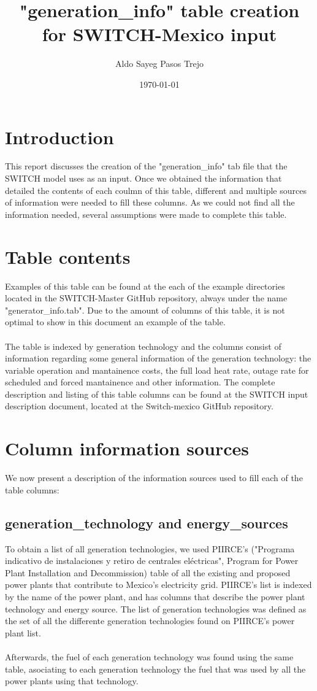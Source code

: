 \documentclass[12pt,letterpaper]{article}
\title{"generation\_info" table creation for SWITCH-Mexico input}
\author[1,2]{Aldo Sayeg Pasos Trejo}
\affil[1]{\textit{Physics Departament. Facultad de Ciencias. Universidad Nacional Autónoma de México}}
\affil[2]{\textit{Visiting Student Researcher for the Berkeley Energy and Climate Institute at University of California, Berkeley}}
\date{\today}
\begin{document}
\maketitle
\section{Introduction}
This report discusses the creation of the "generation\_info" tab file that the SWITCH model uses as an input. Once we obtained the information that detailed the contents of each coulmn of this table,  different and multiple sources of information were needed to fill these columns. As we could not find all the information needed, several assumptions were made to complete this table.
\section{Table contents}
Examples of this table can be found at the each of the example directories located in the SWITCH-Master GitHub \cite{master} repository, always under the name "generator\_info.tab". Due to the amount of columns of this table, it is not optimal to show in this document an example of the table. 
\\
\\The table is indexed by generation technology and the columns consist of information regarding some general information of the generation technology: the variable operation and mantainence costs, the full load heat rate, outage rate for scheduled and forced mantainence and other information. The complete description and listing of this table columns can be found at the SWITCH input description document\cite{glos}, located at the Switch-mexico GitHub repository.
\section{Column information sources}
We now present a description of the information sources used to fill each of the table columns:
\subsection{generation\_technology and energy\_sources}
To obtain a list of all generation technologies, we used PIIRCE's ("Programa indicativo de instalaciones y retiro de centrales eléctricas", Program for Power Plant Installation and Decommission) table of all the existing and proposed power plants that contribute to Mexico's electricity grid. PIIRCE's list is indexed by the name of the power plant, and has columns that describe the power plant technology and energy source. The list of generation technologies was defined as the set of all the differente generation technologies found on PIIRCE's power plant list. 
\\
\\Afterwards, the fuel of each generation technology was found using the same table, asociating to each generation technology the fuel that was used by all the power plants using that technology.
\end{document}

